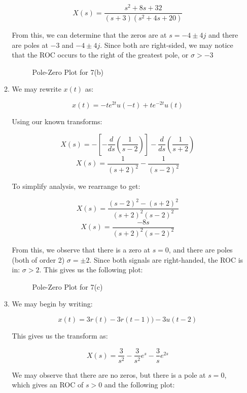 \begin{enumerate}
\begin{enumerate}
        $$\boxed{X(s)=\frac{s^2+8s+32}{(s+3)(s^2+4s+20)}}$$

        From this, we can determine that the zeros are at $s=-4\pm4j$ and there are poles at $-3$ and $-4\pm4j$. Since both are right-sided, we may notice that the ROC occurs to the right of the greatest pole, or $\sigma>-3$

        \begin{figure}[H]
          \centering
          
          \caption{Pole-Zero Plot for 7(b)}
          \label{fig:3}
        \end{figure}

      \item 

        We may rewrite $x(t)$ as:

        $$x(t)=-te^{2t}u(-t)+te^{-2t}u(t)$$

        Using our known transforms:

        $$X(s)=-\left[ -\frac{d}{ds}\left( \frac{1}{s-2} \right) \right]-\frac{d}{ds}\left( \frac{1}{s+2} \right)$$
        $$\boxed{X(s)=\frac{1}{(s+2)^2}-\frac{1}{(s-2)^2}}$$

        To simplify analysis, we rearrange to get:

        $$X(s)=\frac{(s-2)^2-(s+2)^2}{(s+2)^2(s-2)^2}$$
        $$X(s)=\frac{-8s}{(s+2)^2(s-2)^2}$$

        From this, we observe that there is a zero at $s=0$, and there are poles (both of order 2) $\sigma=\pm 2$. Since both signals are right-handed, the ROC is in: $\sigma>2$. This gives us the following plot:

        \begin{figure}[H]
          \centering
          
          \caption{Pole-Zero Plot for 7(c)}
          \label{fig:4}
        \end{figure}

      \item 

        We may begin by writing:

        $$x(t)=3r(t)-3r(t-1))-3u(t-2)$$

        This gives us the transform as:

        $$\boxed{X(s)=\frac{3}{s^2}-\frac{3}{s^2}e^{s}-\frac{3}{s}e^{2s}}$$

        We may observe that there are no zeros, but there is a pole at $s=0$, which gives an ROC of $s>0$ and the following plot:


\end{enumerate}
\end{enumerate}
